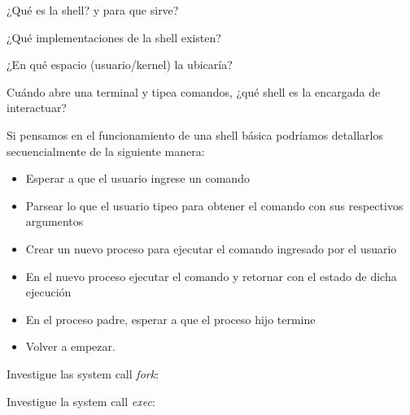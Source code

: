 \begin{questions}
\question ¿Qué es la shell? y para que sirve?

\question ¿Qué implementaciones de la shell existen?

\question ¿En qué espacio (usuario/kernel) la ubicaría?

\question Cuándo abre una terminal y tipea comandos, ¿qué shell es la encargada de interactuar?
 
\question Si pensamos en el funcionamiento de una shell básica podríamos
detallarlos secuencialmente de la siguiente manera:
\begin{itemize}
\item Esperar a que el usuario ingrese un comando
\item Parsear lo que el usuario tipeo para obtener el comando con sus respectivos argumentos
\item Crear un nuevo proceso para ejecutar el comando ingresado por el usuario
\item En el nuevo proceso ejecutar el comando y retornar con el estado de dicha ejecución
\item En el proceso padre, esperar a que el proceso hijo termine
\item Volver a empezar.
\end{itemize}

\question Investigue las system call \textit{fork}:

\question Investigue la system call \textit{exec}:
\end{questions}
